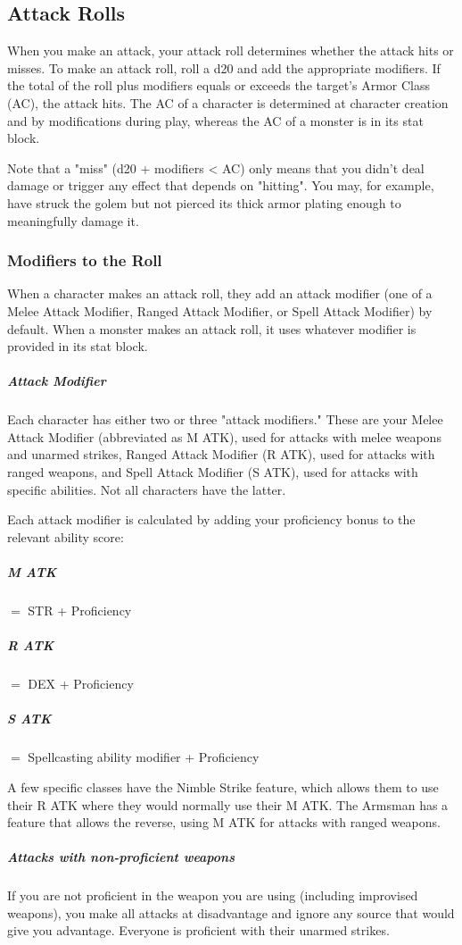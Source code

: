 \subsection{Attack Rolls}

When you make an attack, your attack roll determines whether the attack hits or misses. To make an attack roll, roll a d20 and add the appropriate modifiers. If the total of the roll plus modifiers equals or exceeds the target's Armor Class (AC), the attack hits. The AC of a character is determined at character creation and by modifications during play, whereas the AC of a monster is in its stat block.

Note that a "miss" (d20 + modifiers \textless{} AC) only means that you didn't deal damage or trigger any effect that depends on "hitting". You may, for example, have struck the golem but not pierced its thick armor plating enough to meaningfully damage it.

\subsubsection{Modifiers to the Roll}

When a character makes an attack roll, they add an attack modifier (one of a Melee Attack Modifier, Ranged Attack Modifier, or Spell Attack Modifier) by default. When a monster makes an attack roll, it uses whatever modifier is provided in its stat block.

\subparagraph*{Attack Modifier} Each character has either two or three "attack modifiers." These are your Melee Attack Modifier (abbreviated as M ATK), used for attacks with melee weapons and unarmed strikes, Ranged Attack Modifier (R ATK), used for attacks with ranged weapons, and Spell Attack Modifier (S ATK), used for attacks with specific abilities. Not all characters have the latter.

Each attack modifier is calculated by adding your proficiency bonus to the relevant ability score:

\subparagraph*{M ATK} $ = $ STR + Proficiency
\subparagraph*{R ATK} $ = $ DEX + Proficiency
\subparagraph*{S ATK} $ = $ Spellcasting ability modifier + Proficiency

A few specific classes have the Nimble Strike feature, which allows them to use their R ATK where they would normally use their M ATK. The Armsman has a feature that allows the reverse, using M ATK for attacks with ranged weapons.

\subparagraph*{Attacks with non-proficient weapons} If you are not proficient in the weapon you are using (including improvised weapons), you make all attacks at disadvantage and ignore any source that would give you advantage. Everyone is proficient with their unarmed strikes.

